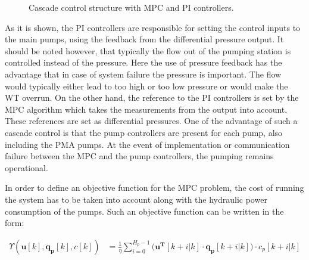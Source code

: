 
\begin{figure}[H]
\centering
 
\caption{Cascade control structure with MPC and PI controllers.}
\label{fig:control_structure}
\end{figure}

As it is shown, the PI controllers are responsible for setting the control inputs to the main pumps, using the feedback from the differential pressure output. It should be noted however, that typically the flow out of the pumping station is controlled instead of the pressure. Here the use of pressure feedback has the advantage that in case of system failure the pressure is important. The flow would typically either lead to too high or too low pressure or would make the WT overrun. On the other hand, the reference to the PI controllers is set by the MPC algorithm which takes the measurements from the output into account. These references are set as differential pressures. One of the advantage of such a cascade control is that the pump controllers are present for each pump, also including the PMA pumps. At the event of implementation or communication failure between the MPC and the pump controllers, the pumping remains operational. 
 



In order to define an objective function for the MPC problem, the cost of running the system has to be taken into account along with the hydraulic power consumption of the pumps. Such an objective function can be written in the form: 

\begin{align}
 \Upsilon(\bm{u}[k],\bm{q_p}[k],c[k]) &= \frac{1}{\eta} \sum_{i=0}^{H_p-1} \Big( \bm{u^T}[k+i|k] \cdot  \bm{q_{p}}[k+i|k]\Big)\cdot c_p[k+i|k] \label{eqcost} 
\end{align}

